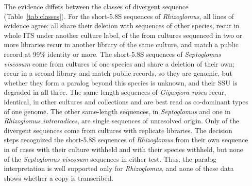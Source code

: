 \documentclass[11pt]{article}
\newcommand{\spn}[1]{\emph{#1}}   %
\begin{document}
The evidence differs between the classes of divergent sequence (Table~\ref{tab:classes}). For the short-5.8S
sequences of \spn{Rhizoglomus}, all lines of evidence agree: all \ClRhCopies{} share their deletion with sequences
of other species, \ClRhRecur{} recur in whole ITS under another culture label, \ClRhLibrepYes{} of the
\ClRhLibrepTested{} from cultures sequenced in two or more libraries recur in another library of the same culture,
and \ClRhExternal{} match a public record at 99\% identity or more. The \ClSvCopies{} short-5.8S sequences of
\spn{Septoglomus viscosum} come from \ClSvCultures{} cultures of one species and share a deletion of their own;
\ClSvLibrepYes{} recur in a second library and match public records, so they are genomic, but whether they form a
paralog beyond this species is unknown, and their SSU is degraded in all three. The same-length sequences of
\spn{Gigaspora rosea} recur, identical, in other cultures and collections and are best read as co-dominant types of
one genome. The other \ClOtCopies{} same-length sequences, in \spn{Septoglomus} and one in \spn{Rhizoglomus
intraradices}, are single sequences of unresolved origin. Only \ClAllLibrepTested{} of the \ClAllCopies{} divergent
sequences come from cultures with replicate libraries. The decision steps recognized the short-5.8S sequences of
\spn{Rhizoglomus} from their own sequence in \ClRhRecCulture{} of \ClRhCopies{} cases with their culture withheld and
\ClRhRecSpecies{} with their species withheld, but none of the \spn{Septoglomus viscosum} sequences in either test.
Thus, the paralog interpretation is well supported only for \spn{Rhizoglomus}, and none of these data shows whether a
copy is transcribed.

\end{document}
